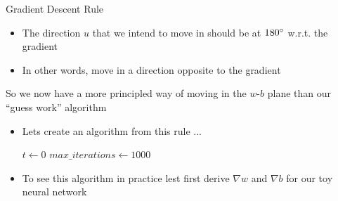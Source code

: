\documentclass[aspectratio=169]{beamer}
\begin{document}
\begin{frame}
\begin{overlayarea}{\textwidth}{\textheight}

\begin{block}{Gradient Descent Rule}
\begin{itemize}
    \item<1-> The direction $u$ that we intend to move in should be at $180\degree$ w.r.t. the gradient
    \item<2-> In other words, move in a direction opposite to the gradient
\end{itemize}
\end{block}


 {So we now have a more principled way of moving in the $w$-$b$ plane than our ``guess work'' algorithm}


\end{overlayarea}
\end{frame}

\begin{frame}
\begin{overlayarea}{\textwidth}{\textheight}

\begin{itemize}
    
\item <1-> Lets create an algorithm from this rule ... 

 {
\begin{algorithm}[H]
\SetAlgoLined
$t \leftarrow 0$\; 
$max\_iterations\leftarrow 1000$\;
 \caption{gradient\_descent()}
\end{algorithm}
}

\item <2-> To see this algorithm in practice lest first derive $\nabla w$ and $\nabla b$ for our toy neural network

\end{itemize}

\end{overlayarea}

\end{frame}
\end{document}
